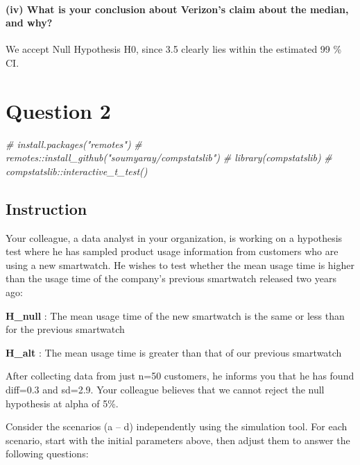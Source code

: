 \documentclass[
]{article}
\newenvironment{Shaded}{\begin{snugshade}}{\end{snugshade}}
\newcommand{\CommentTok}[1]{\textcolor[rgb]{0.56,0.35,0.01}{\textit{#1}}}
\begin{document}
\hypertarget{iv-what-is-your-conclusion-about-verizons-claim-about-the-median-and-why}{%
\paragraph{(iv) What is your conclusion about Verizon's claim about the
median, and
why?}\label{iv-what-is-your-conclusion-about-verizons-claim-about-the-median-and-why}}

We accept Null Hypothesis H0, since 3.5 clearly lies within the
estimated 99 \% CI.

\hypertarget{question-2}{%
\section{Question 2}\label{question-2}}

\begin{Shaded}
\begin{Highlighting}[]
\CommentTok{\# install.packages("remotes")}
\CommentTok{\# remotes::install\_github("soumyaray/compstatslib")}
\CommentTok{\# library(compstatslib)}
\CommentTok{\# compstatslib::interactive\_t\_test()}
\end{Highlighting}
\end{Shaded}

\hypertarget{instruction-3}{%
\subsection{Instruction}\label{instruction-3}}

Your colleague, a data analyst in your organization, is working on a
hypothesis test where he has sampled product usage information from
customers who are using a new smartwatch. He wishes to test whether the
mean usage time is higher than the usage time of the company's previous
smartwatch released two years ago:

\textbf{H\_null} : The mean usage time of the new smartwatch is the same
or less than for the previous smartwatch

\textbf{H\_alt} : The mean usage time is greater than that of our
previous smartwatch

After collecting data from just n=50 customers, he informs you that he
has found diff=0.3 and sd=2.9. Your colleague believes that we cannot
reject the null hypothesis at alpha of 5\%.

Consider the scenarios (a -- d) independently using the simulation tool.
For each scenario, start with the initial parameters above, then adjust
them to answer the following questions:
\end{document}
